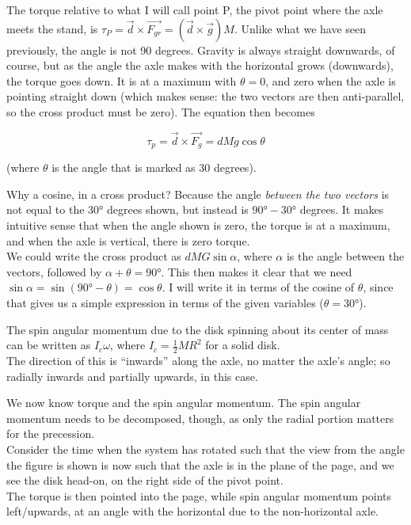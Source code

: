 \documentclass[8.01x]{subfiles}
\begin{document}
The torque relative to what I will call point P, the pivot point where the axle meets the stand, is $\tau_P = \vec{d} \times \vec{F_{gr}} = (\vec{d} \times \vec{g})M$. Unlike what we have seen previously, the angle is not 90 degrees. Gravity is always straight downwards, of course, but as the angle the axle makes with the horizontal grows (downwards), the torque goes down. It is at a maximum with $\theta = 0$, and zero when the axle is pointing straight down (which makes sense: the two vectors are then anti-parallel, so the cross product must be zero). The equation then becomes

\begin{equation}
\tau_p = \vec{d} \times \vec{F_g} = d M g \cos \theta
\end{equation}

(where $\theta$ is the angle that is marked as 30 degrees).

Why a cosine, in a cross product? Because the angle \emph{between the two vectors} is not equal to the $\ang{30}$ degrees shown, but instead is $\ang{90} - \ang{30}$ degrees. It makes intuitive sense that when the angle shown is zero, the torque is at a maximum, and when the axle is vertical, there is zero torque.\\
We could write the cross product as $d M G \sin \alpha$, where $\alpha$ is the angle between the vectors, followed by $\alpha + \theta = \ang{90}$. This then makes it clear that we need $\sin \alpha = \sin(\ang{90} - \theta) = \cos \theta$. I will write it in terms of the cosine of $\theta$, since that gives us a simple expression in terms of the given variables ($\theta = \ang{30}$).

The spin angular momentum due to the disk spinning about its center of mass can be written as $I_c \omega$, where $\displaystyle I_c = \frac{1}{2} M R^2$ for a solid disk.\\
The direction of this is ``inwards'' along the axle, no matter the axle's angle; so radially inwards and partially upwards, in this case.

We now know torque and the spin angular momentum. The spin angular momentum needs to be decomposed, though, as only the radial portion matters for the precession.\\
Consider the time when the system has rotated such that the view from the angle the figure is shown is now such that the axle is in the plane of the page, and we see the disk head-on, on the right side of the pivot point.\\
The torque is then pointed into the page, while spin angular momentum points left/upwards, at an angle with the horizontal due to the non-horizontal axle.
\end{document}
